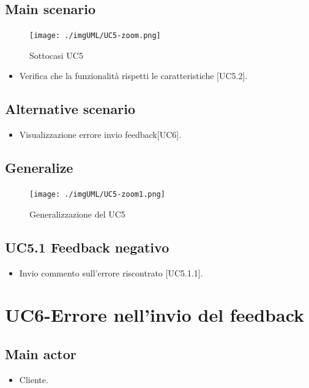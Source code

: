 \documentclass{article}
\begin{document}
    \subsection*{Main scenario}
        \begin{figure}[h]
            \centering
            \texttt{[image: ./imgUML/UC5-zoom.png]}
            \caption{Sottocasi UC5}
            \label{fig:UC5_sottocasi}
        \end{figure}
        \begin{itemize}
            \item Verifica che la funzionalità rispetti le caratteristiche [UC5.2].
        \end{itemize}
        
    \subsection*{Alternative scenario}
    \begin{itemize}
        \item Visualizzazione errore invio feedback[UC6].
    \end{itemize}

    \subsection*{Generalize}
    \begin{figure}[h]
            \centering
            \texttt{[image: ./imgUML/UC5-zoom1.png]}
            \caption{Generalizzazione del UC5}
            \label{fig:UC5_generalizzazione}
        \end{figure}
    \subsection{UC5.1 Feedback negativo}
    \begin{itemize}
            \item Invio commento sull'errore riscontrato [UC5.1.1].
        \end{itemize}
        
\section{UC6-Errore nell'invio del feedback}

     \subsection*{Main actor}
     \begin{itemize}
         \item Cliente.
     \end{itemize}
\end{document}
